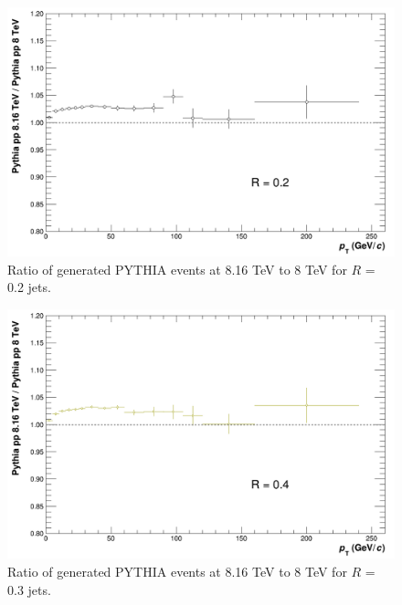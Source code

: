 \begin{figure}[h!]
    \centering
    \includegraphics[width=\textwidth]{figures/ScaleFactorPythia/PythiaRatio_R02.png}
    \caption{Ratio of generated \pp PYTHIA events at 8.16 TeV to 8 TeV for $R$ = 0.2 jets.}
    \label{fig:appPythiaScaleFactorR02}
\end{figure}

\begin{figure}[h!]
    \centering
    \includegraphics[width=\textwidth]{figures/ScaleFactorPythia/PythiaRatio_R04.png}
    \caption{Ratio of generated \pp PYTHIA events at 8.16 TeV to 8 TeV for $R$ = 0.3 jets.}
    \label{fig:appPythiaScaleFactorR03}
\end{figure}

